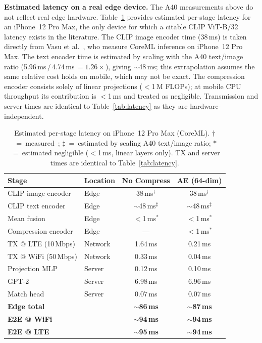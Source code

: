 \textbf{Estimated latency on a real edge device.} The A40 measurements above do not reflect real edge hardware. Table~\ref{tab:latency_mobile} provides estimated per-stage latency for an iPhone~12 Pro Max, the only device for which a citable CLIP ViT-B/32 latency exists in the literature. The CLIP image encoder time (38\,ms) is taken directly from Vasu et al.~\cite{vasu2024mobileclip}, who measure CoreML inference on iPhone~12 Pro Max. The text encoder time is estimated by scaling with the A40 text/image ratio (5.96\,ms\,/\,4.74\,ms\,$= 1.26\times$), giving $\sim$48\,ms; this extrapolation assumes the same relative cost holds on mobile, which may not be exact. The compression encoder consists solely of linear projections ($<$1\,M FLOPs); at mobile CPU throughput its contribution is $<$1\,ms and treated as negligible. Transmission and server times are identical to Table~\ref{tab:latency} as they are hardware-independent.

\begin{table}[h]
\centering
\caption{Estimated per-stage latency on iPhone~12 Pro Max (CoreML). $\dagger$~=~measured~\cite{vasu2024mobileclip}; $\ddagger$~=~estimated by scaling A40 text/image ratio; $*$~=~estimated negligible ($<$1\,ms, linear layers only). TX and server times are identical to Table~\ref{tab:latency}.}
\label{tab:latency_mobile}
\begin{tabular}{llcc}
\toprule
\textbf{Stage} & \textbf{Location} & \textbf{No Compress} & \textbf{AE (64-dim)} \\
\midrule
CLIP image encoder  & Edge    & 38\,ms$^\dagger$  & 38\,ms$^\dagger$ \\
CLIP text encoder   & Edge    & $\sim$48\,ms$^\ddagger$ & $\sim$48\,ms$^\ddagger$ \\
Mean fusion         & Edge    & $<$1\,ms$^*$      & $<$1\,ms$^*$ \\
Compression encoder & Edge    & —                 & $<$1\,ms$^*$ \\
\midrule
TX @ LTE (10\,Mbps) & Network & 1.64\,ms          & 0.21\,ms \\
TX @ WiFi (50\,Mbps)& Network & 0.33\,ms          & 0.04\,ms \\
\midrule
Projection MLP      & Server  & 0.12\,ms          & 0.10\,ms \\
GPT-2               & Server  & 6.98\,ms          & 6.96\,ms \\
Match head          & Server  & 0.07\,ms          & 0.07\,ms \\
\midrule
\textbf{Edge total}  & & $\sim$\textbf{86\,ms} & $\sim$\textbf{87\,ms} \\
\textbf{E2E @ WiFi}  & & $\sim$\textbf{94\,ms} & $\sim$\textbf{94\,ms} \\
\textbf{E2E @ LTE}   & & $\sim$\textbf{95\,ms} & $\sim$\textbf{94\,ms} \\
\bottomrule
\end{tabular}
\end{table}

